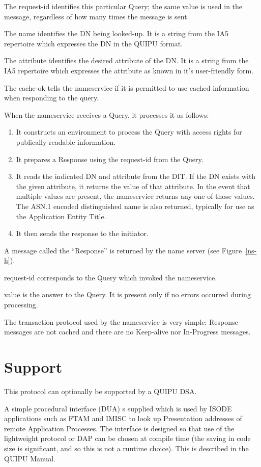
The request-id identifies this particular Query; the same value is used
in the message, regardless of how many times the message is sent.

The name identifies the DN being looked-up.  It is a string from the IA5
repertoire which expresses the DN in the QUIPU format.

The attribute identifies the desired attribute of the DN.  It is a
string from the IA5 repertoire which expresses the attribute as known in
it's user-friendly form.

The cache-ok tells the nameservice if it is permitted to use cached
information when responding to the query.

When the nameservice receives a Query, it processes it as follows:

\begin{enumerate}

\item It constructs an environment to process the Query with access rights
for publically-readable information.

\item It prepares a Response using the request-id from the Query.

\item It reads the indicated DN and attribute from the DIT.  If the DN
exists with the given attribute, it returns the value of that attribute.
In the event that multiple values are present, the nameservice returns
any one of those values.  The ASN.1 encoded distinguished name is also
returned, typically for use as the Application Entity Title.

\item It then sends the response to the initiator.
\end {enumerate}

A message called the ``Response'' is returned by the name server (see
Figure~\ref{ns-h}).

request-id corresponds to the Query which invoked the nameservice.

value is the answer to the Query.  It is present only if no errors
occurred during processing.

The transaction protocol used by the nameservice is very
simple: Response messages are not cached and there are no Keep-alive nor
In-Progress messages.

\section {Support}

This protocol can optionally be supported by a QUIPU DSA.

A simple procedural interface (DUA) s supplied which is used by
ISODE applications such as FTAM and IMISC to
look up Presentation addresses of remote Application Processes.
The interface is designed so that use of the lightweight protocol or DAP can
be chosen at compile time (the saving in code size is significant, and so
this is not a runtime choice).   This is described in the QUIPU Manual.

